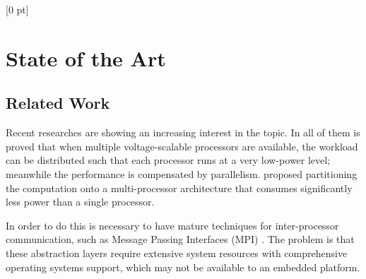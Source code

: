 \titlespacing{\chapter}{0 pt}{30 pt}{50 pt}[0 pt]
\titleformat{\section}{\Large\bfseries}{\thesection}{0 pt}{\hspace{30 pt}}
\titleformat{\subsection}{\large\bfseries}{\thesubsection}{0 pt}{\hspace{30 pt}}
\pagestyle{fancy}
\fancyhead[LO,LE]{\footnotesize\textit{\leftmark}}
\fancyhead[RO,RE]{\thepage}
\fancyfoot[CO,CE]{}

\chapter{State of the Art} %

\normalsize

\section{Related Work}
\noindent


Recent researches \cite{Saldana} \cite{Gallego} \cite{McMahon} \cite{Liu} are
showing an increasing interest in the topic. In all of them is proved that when
multiple voltage-scalable processors are available, the workload can be
distributed such that each processor runs at a very low-power level; meanwhile
the performance is compensated by parallelism. \cite{Weglarz} proposed
partitioning the computation onto a multi-processor architecture that consumes
significantly less power than a single processor.


In order to do this is necessary to have mature techniques for inter-processor
communication, such as Message Passing Interfaces (MPI) \cite{lam-mpi}
\cite{mpi-forum}. The problem is that these abstraction layers require
extensive system resources with comprehensive operating systems support, which
may not be available to an embedded platform.

